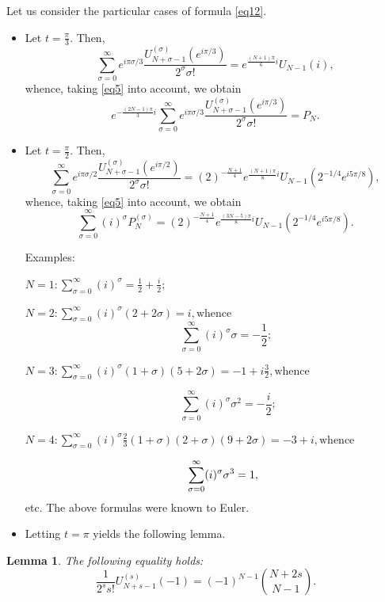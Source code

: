 \documentclass{article}
\newtheorem{lemma}[thm]{Lemma}
\begin{document}
Let us consider the particular cases of formula \eqref{eq12}.
\begin{itemize}
\item Let $t = \frac{\pi}{3}$. Then,
$$
\sum_{\sigma = 0}^{\infty}e^{i\pi\sigma/3}\frac{U_{N+\sigma-1}^{(\sigma)}(e^{i\pi/3})}{2^\sigma \sigma!} = e^{\frac{(N+1)\pi}{6}i}U_{N-1}(i),
$$
whence, taking \eqref{eq5} into account, we obtain
$$
e^{-\frac{(2N-1)\pi}{3}i}\sum_{\sigma = 0}^{\infty}e^{i\pi\sigma/3}\frac{U_{N+\sigma-1}^{(\sigma)}(e^{i\pi/3})}{2^\sigma \sigma!} = P_N.
$$

\item Let $t = \frac{\pi}{2}$. Then,
$$
\sum_{\sigma = 0}^{\infty}e^{i\pi\sigma/2}\frac{U_{N+\sigma-1}^{(\sigma)}(e^{i\pi/2})}{2^\sigma \sigma!} = (2)^{-\frac{N+1}{4}}e^{\frac{(N+1)\pi}{8}i}U_{N-1}(2^{-1/4}e^{i5\pi/8}),
$$
whence, taking \eqref{eq5} into account, we obtain
$$
\sum_{\sigma = 0}^{\infty}(i)^\sigma P_N^{(\sigma)} = (2)^{-\frac{N+1}{4}}e^{\frac{(3N-5)\pi}{8}i}U_{N-1}(2^{-1/4}e^{i5\pi/8}).
$$

Examples:

$\displaystyle
N=1: \sum_{\sigma=0}^\infty (i)^\sigma = \frac12+\frac i2;
$

$\displaystyle
N=2: \sum_{\sigma=0}^\infty (i)^\sigma(2+2\sigma) = i, \mbox{whence}
$
$$
\qquad \sum_{\sigma=0}^\infty (i)^\sigma\sigma =- \frac12;
$$

$\displaystyle
N=3: \sum_{\sigma=0}^\infty (i)^\sigma(1+\sigma)(5+2\sigma) =-1+ i\frac32, \mbox{whence}
$

$$\hspace{1cm} \sum_{\sigma=0}^\infty (i)^\sigma\sigma^2 =- \frac i2;
$$

$\displaystyle
N=4: \sum_{\sigma=0}^\infty (i)^\sigma\frac23(1+\sigma)(2+\sigma)(9+2\sigma) =-3+ i,\mbox{whence}
$

$$\hspace{.5cm} \sum_{\sigma=0}^\infty (i)^\sigma\sigma^3 =1,
$$
etc. The above formulas were known to Euler.

\item Letting $t = \pi$ yields the following lemma.
\end{itemize}

\begin{lemma}\label{lem4}
The following equality holds:
$$
\frac{1}{2^s s!}U_{N + s - 1}^{(s)}(-1) = (-1)^{N-1}{N + 2s \choose N - 1}.
$$
\end{lemma}
\end{document}
